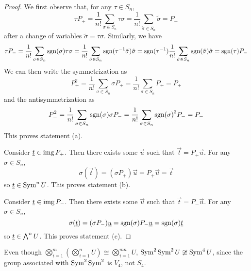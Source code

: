 \begin{proof}
    We first observe that, for any \(\tau \in S_n\),
    \begin{equation*}
        \tau P_+ = \frac{1}{n!} \sum_{\sigma \in S_n} \tau\sigma
        = \frac{1}{n!} \sum_{\tilde{\sigma} \in S_n} \tilde{\sigma}
        = P_+
    \end{equation*}
    after a change of variables \(\tilde{\sigma} = \tau\sigma\).
    Similarly, we have
    \begin{equation*}
        \tau P_- = \frac{1}{n!} \sum_{\sigma \in S_n} \operatorname{sgn}(\sigma) \tau\sigma
        = \frac{1}{n!} \sum_{\tilde{\sigma} \in S_n} \operatorname{sgn}(\tau^{-1}\tilde{\sigma}) \tilde{\sigma}
        = \operatorname{sgn}(\tau^{-1}) \frac{1}{n!} \sum_{\tilde{\sigma} \in S_n} \operatorname{sgn}(\tilde{\sigma}) \tilde{\sigma}
        = \operatorname{sgn}(\tau) P_-
    \end{equation*}
    We can then write the symmetrization as
    \begin{equation*}
        P_+^2 = \frac{1}{n!} \sum_{\sigma \in S_n} \sigma P_+
        = \frac{1}{n!} \sum_{\sigma \in S_n} P_+ = P_+
    \end{equation*}
    and the antisymmetrization as
    \begin{equation*}
        P_-^2 = \frac{1}{n!} \sum_{\sigma \in S_n} \operatorname{sgn}(\sigma) \sigma P_-
        = \frac{1}{n!} \sum_{\sigma \in S_n} {\operatorname{sgn}(\sigma)}^2 P_- = P_-
    \end{equation*}
    This proves statement (a).

    Consider \(\underline{t} \in \operatorname{img} P_+\).
    Then there exists some \(\vec{u}\) such that \(\vec{t} = P_+\vec{u}\).
    For any \(\sigma \in S_n\),
    \begin{equation*}
        \sigma(\vec{t}) = (\sigma P_+)\vec{u} = P_+\vec{u} = \vec{t}
    \end{equation*}
    so \(\underline{t} \in \operatorname{Sym}^n U\).
    This proves statement (b).

    Consider \(\underline{t} \in \operatorname{img} P_-\).
    Then there exists some \(\vec{u}\) such that \(\vec{t} = P_-\vec{u}\).
    For any \(\sigma \in S_n\),
    \begin{equation*}
        \sigma(\underline{t}) = (\sigma P_-)\underline{u} = \operatorname{sgn}(\sigma) P_-\underline{u} = \operatorname{sgn}(\sigma)\underline{t}
    \end{equation*}
    so \(\underline{t} \in \operatorname{{\bigwedge}}^n U\).
    This proves statement (c).
\end{proof}
\begin{remark}
    Even though \(\bigotimes_{i=1}^m (\bigotimes_{i=1}^n U) \cong \bigotimes_{i=1}^{mn} U\),
    \(\operatorname{Sym}^2 \operatorname{Sym}^2 U \ncong \operatorname{Sym}^4 U\),
    since the group associated with \(\operatorname{Sym}^2 \operatorname{Sym}^2\) is \(V_4\), not \(S_4\).
\end{remark}

